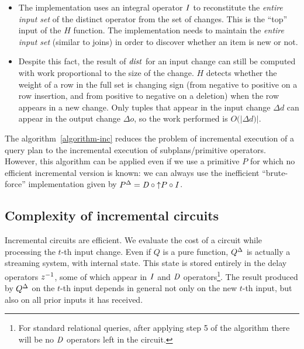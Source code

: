 \begin{itemize}
  \item The implementation uses an integral operator $\mathit{I}$ to
    reconstitute the \emph{entire input set} of the distinct operator
    from the set of changes.  This is the ``top'' input of the $H$
    function.  The implementation needs to maintain the \emph{entire
    input set} (similar to joins) in order to discover whether an item
    is new or not.
  \item Despite this fact, the result of $\mathit{dist}$ for an input
    change can still be computed with work proportional to the size of
    the change.  $H$ detects whether the weight of a row in the full
    set is changing sign (from negative to positive on a row
    insertion, and from positive to negative on a deletion) when the
    row appears in a new change.  Only tuples that appear in
    the input change $\Delta d$ can appear in the output change
    $\Delta o$, so the work performed is $O(|\Delta d)|$.
\end{itemize}

The algorithm~\ref{algorithm-inc} reduces the problem of incremental
execution of a query plan to the incremental execution of
sub\-plans/primitive operators.  However, this algorithm can be
applied even if we use a primitive $P$ for which no efficient
incremental version is known: we can always use the inefficient
``brute-force'' implementation given by ${P}^{\Delta} = \mathit{D} \circ {\uparrow}P
\circ \mathit{I}$.

\vspace{-3ex}


\vspace{-3ex}
\subsection{Complexity of incremental circuits}\label{sec:complexity}

Incremental circuits are efficient.  We evaluate the cost of a circuit
while processing the $t$-th input change.  Even if $Q$ is a pure
function, ${Q}^{\Delta}$ is actually a streaming system, with internal
state.  This state is stored entirely in the delay operators $z^{-1}$,
some of which appear in $\mathit{I}$ and $\mathit{D}$ operators\footnote{For
standard relational queries, after applying step 5 of the algorithm
there will be no $\mathit{D}$ operators left in the circuit.}.  The result
produced by ${Q}^{\Delta}$ on the $t$-th input depends in general not only
on the new $t$-th input, but also on all prior inputs it has received.

